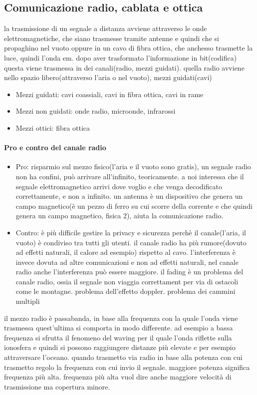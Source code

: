 \subsection{Comunicazione radio, cablata e ottica}
la trasmissione di un segnale a distanza avviene attraverso le onde elettromagnetiche, che siano trasmesse tramite antenne e quindi che si propaghino nel vuoto oppure in un cavo di fibra ottica, che anchesso trasmette la luce, quindi l’onda em.
dopo aver trasformato l'informazione in bit(codifica) questa viene trasmessa in dei canali(radio, mezzi guidati). quella radio avviene nello spazio libero(attraverso l’aria o nel vuoto), mezzi guidati(cavi)
\begin{itemize}
    \item Mezzi guidati: cavi coassiali, cavi in fibra ottica, cavi in rame
    \item Mezzi non guidati: onde radio, microonde, infrarossi
    \item Mezzi ottici: fibra ottica
\end{itemize}
\paragraph{Pro e contro del canale radio}
\begin{itemize}    
    \item Pro: risparmio sul mezzo fisico(l’aria e il vuoto sono gratis), un segnale radio non ha confini, può arrivare all’infinito, teoricamente. a noi interessa che il segnale elettromagnetico arrivi dove voglio e che venga decodificato correttamente, e non a infinito. 
un antenna è un dispositivo che genera un campo magnetico(è un pezzo di ferro su cui scorre della corrente e che quindi genera un campo magnetico, fisica 2), aiuta la comunicazione radio. 
    \item Contro: è più difficile gestire la privacy e sicurezza perchè il canale(l’aria, il vuoto) è condiviso tra tutti gli utenti. il canale radio ha più rumore(dovuto ad effetti naturali, il calore ad esempio) rispetto al cavo. l’interferenza è invece dovuta ad altre comunicazioni e non ad effetti naturali, nel canale radio anche l’interferenza può essere maggiore. il fading è un problema del canale radio, ossia il segnale non viaggia correttament per via di ostacoli come le montagne. problema dell’effetto doppler. problema dei cammini multipli
\end{itemize}
il mezzo radio è passabanda, in base alla frequenza con la quale l'onda viene trasmessa quest'ultima si comporta in modo differente. ad esempio a bassa frequenza si sfrutta il fenomeno del waving per il quale l'onda riflette sulla ionosfera e quindi si possono raggiungere distanze più elevate e per esempio attraversare l'oceano.
quando trasmetto via radio in base alla potenza con cui trasmetto regolo la frequenza con cui invio il segnale. maggiore potenza significa frequenza più alta. frequenza più alta vuol dire anche maggiore velocità di trasmissione ma copertura minore.
